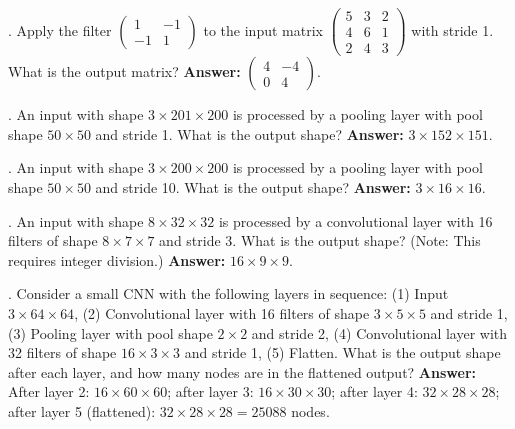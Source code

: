 \noindent
{\bf \theCNNCounter}. Apply the filter $\begin{pmatrix} 1 & -1 \\ -1 & 1 \end{pmatrix}$ to the input matrix $\begin{pmatrix} 5 & 3 & 2 \\ 4 & 6 & 1 \\ 2 & 4 & 3 \end{pmatrix}$ with stride 1. What is the output matrix? {\bf Answer:} $\begin{pmatrix} 4 & -4 \\ 0 & 4 \end{pmatrix}$.

\bigskip

\noindent
{\bf \theCNNCounter}. An input with shape $3 \times 201 \times 200$ is processed by a pooling layer with pool shape $50 \times 50$ and stride 1. What is the output shape? {\bf Answer:} $3 \times 152 \times 151$.

\bigskip

\noindent
{\bf \theCNNCounter}. An input with shape $3 \times 200 \times 200$ is processed by a pooling layer with pool shape $50 \times 50$ and stride 10. What is the output shape? {\bf Answer:} $3 \times 16 \times 16$.

\bigskip

\noindent
{\bf \theCNNCounter}. An input with shape $8 \times 32 \times 32$ is processed by a convolutional layer with 16 filters of shape $8 \times 7 \times 7$ and stride 3. What is the output shape? (Note: This requires integer division.) {\bf Answer:} $16 \times 9 \times 9$.

\bigskip

\noindent
{\bf \theCNNCounter}. Consider a small CNN with the following layers in sequence: (1) Input $3 \times 64 \times 64$, (2) Convolutional layer with 16 filters of shape $3 \times 5 \times 5$ and stride 1, (3) Pooling layer with pool shape $2 \times 2$ and stride 2, (4) Convolutional layer with 32 filters of shape $16 \times 3 \times 3$ and stride 1, (5) Flatten. What is the output shape after each layer, and how many nodes are in the flattened output? {\bf Answer:} After layer 2: $16 \times 60 \times 60$; after layer 3: $16 \times 30 \times 30$; after layer 4: $32 \times 28 \times 28$; after layer 5 (flattened): $32 \times 28 \times 28 = 25088$ nodes.
